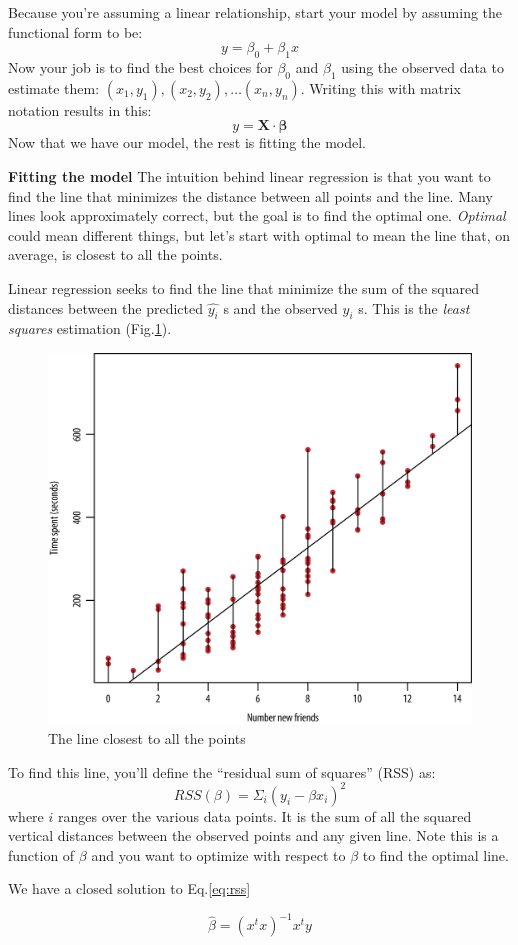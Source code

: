 Because you're assuming a linear relationship, start your model by assuming the functional form to be:
$$
    y=\beta_{0}+\beta_{1} x
$$
Now your job is to find the best choices for \(\beta_{0}\) and \(\beta_{1}\) using the observed data to estimate them: \(\left(x_{1}, y_{1}\right),\left(x_{2}, y_{2}\right), \ldots\left(x_{n}, y_{n}\right)\). Writing this with matrix notation results in this:
$$
    y=\mathbf{X} \cdot \boldsymbol{\beta}
$$
Now that we have our model, the rest is fitting the model.

\textbf{Fitting the model} The intuition behind linear regression is that you want to find the line that minimizes the distance between all points and the line. Many lines look approximately correct, but the goal is to find the optimal one. \textit{Optimal} could mean different things, but let's start with optimal to mean the line that, on average, is closest to all the points.

Linear regression seeks to find the line that minimize the sum of the squared distances between the predicted \(\widehat{y_{i}}\) s and the observed \(y_{i}\) s. This is the \textit{least squares} estimation (Fig.\ref{fig:algo_4}).
\begin{figure}[H]
    \centering
    \includegraphics[width=0.7\linewidth]{imgs/fundamental_algo/algo_4.png}
    \caption{The line closest to all the points}
    \label{fig:algo_4}
\end{figure}
To find this line, you'll define the ``residual sum of squares'' (RSS) as:
\begin{equation}
    R S S(\beta)=\Sigma_{i}\left(y_{i}-\beta x_{i}\right)^{2}
    \label{eq:rss}
\end{equation}
where \(i\) ranges over the various data points. It is the sum of all the squared vertical distances between the observed points and any given line. Note this is a function of \(\beta\) and you want to optimize with respect to \(\beta\) to find the optimal line.

We have a closed solution to Eq.\ref{eq:rss}

$$
    \hat{\beta}=\left(x^{t} x\right)^{-1} x^{t} y
$$

